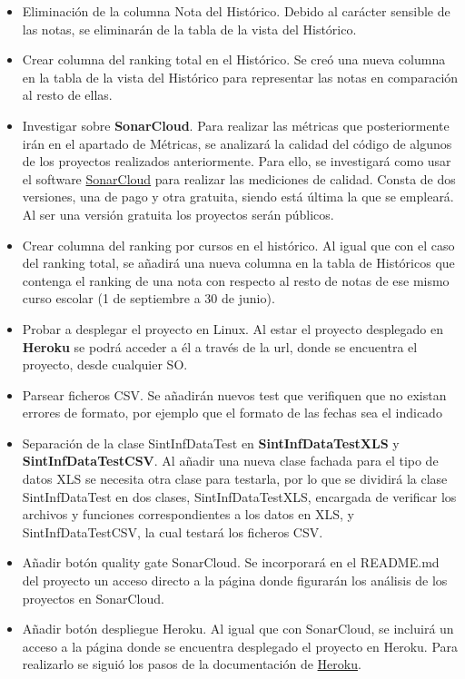 \begin{itemize}
	\tightlist
	\item Eliminación de la columna Nota del Histórico. 
		Debido al carácter sensible de las notas, se eliminarán de la tabla de la vista del Histórico.
	\item Crear columna del ranking total en el Histórico. 
		Se creó una nueva columna en la tabla de la vista del Histórico para representar las notas en comparación al resto de ellas.
	\item Investigar sobre \textbf{SonarCloud}. 
		Para realizar las métricas que posteriormente irán en el apartado de Métricas, se analizará la calidad del código de algunos de los proyectos realizados anteriormente. Para ello, se investigará como usar el software \href{https://sonarcloud.io/}{SonarCloud} para realizar las mediciones de calidad. Consta de dos versiones, una de pago y otra gratuita, siendo está última la que se empleará. Al ser una versión gratuita los proyectos serán públicos. 
	\item Crear columna del ranking por cursos en el histórico. 
		Al igual que con el caso del ranking total, se añadirá una nueva columna en la tabla de Históricos que contenga el ranking de una nota con respecto al resto de notas de ese mismo curso escolar (1 de septiembre a 30 de junio). 
	\item Probar a desplegar el proyecto en Linux. 
	 	Al estar el proyecto desplegado en \textbf{Heroku} se podrá acceder a él a través de la url, donde se encuentra el proyecto, desde cualquier SO.
	\item Parsear ficheros CSV. 
		Se añadirán nuevos test que verifiquen que no existan errores de formato, por ejemplo que el formato de las fechas sea el indicado
	\item Separación de la clase SintInfDataTest en \textbf{SintInfDataTestXLS} y \textbf{SintInfDataTestCSV}. 
		 Al añadir una nueva clase fachada para el tipo de datos XLS se necesita otra clase para testarla, por lo que se dividirá la clase SintInfDataTest en dos clases, SintInfDataTestXLS, encargada de verificar los archivos y funciones correspondientes a los datos en XLS, y SintInfDataTestCSV, la cual testará los ficheros CSV.
	 \item Añadir botón quality gate SonarCloud.  
		 Se incorporará en el README.md del proyecto un acceso directo a la página donde figurarán los análisis de los proyectos en SonarCloud. 
	 \item Añadir botón despliegue Heroku. 
	  	Al igual que con SonarCloud, se incluirá un acceso a la página donde se encuentra desplegado el proyecto en Heroku. Para realizarlo se siguió los pasos de la documentación de \href{https://devcenter.heroku.com/articles/heroku-button}{Heroku}.

\end{itemize}
